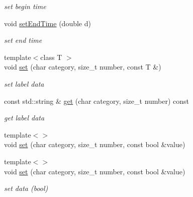 \begin{DoxyCompactItemize}
\begin{DoxyCompactList}\small\item\em set begin time \end{DoxyCompactList}\item 
\hypertarget{classsinsy_1_1LabelData_aad4e88d3c0b7f4a86409483a89973b14}{void \hyperlink{classsinsy_1_1LabelData_aad4e88d3c0b7f4a86409483a89973b14}{set\-End\-Time} (double d)}\label{classsinsy_1_1LabelData_aad4e88d3c0b7f4a86409483a89973b14}

\begin{DoxyCompactList}\small\item\em set end time \end{DoxyCompactList}\item 
{\footnotesize template$<$class T $>$ }\\void \hyperlink{classsinsy_1_1LabelData_a6f9cfcd19a9265d201be26df961c4e1e}{set} (char category, size\-\_\-t number, const \-T \&)
\begin{DoxyCompactList}\small\item\em set label data \end{DoxyCompactList}\item 
const std\-::string \& \hyperlink{classsinsy_1_1LabelData_ae27b8db2dc06becc0b029029ffbec1f4}{get} (char category, size\-\_\-t number) const 
\begin{DoxyCompactList}\small\item\em get label data \end{DoxyCompactList}\item 
{\footnotesize template$<$$>$ }\\void \hyperlink{classsinsy_1_1LabelData_adc696bf515a05f46a2c5dc33650025ae}{set} (char category, size\-\_\-t number, const bool \&value)
\item 
\hypertarget{classsinsy_1_1LabelData_adc696bf515a05f46a2c5dc33650025ae}{{\footnotesize template$<$$>$ }\\void \hyperlink{classsinsy_1_1LabelData_adc696bf515a05f46a2c5dc33650025ae}{set} (char category, size\-\_\-t number, const bool \&value)}\label{classsinsy_1_1LabelData_adc696bf515a05f46a2c5dc33650025ae}

\begin{DoxyCompactList}\small\item\em set data (bool) \end{DoxyCompactList}\end{DoxyCompactItemize}
